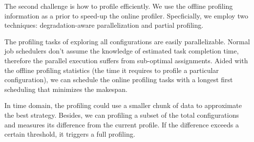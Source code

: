The second challenge is how to profile efficiently. We use the offline profiling
information as a prior to speed-up the online profiler. Specficially, we employ
two techniques: degradation-aware parallelization and partial profiling.

 The profiling tasks of exploring all
configurations are easily parallelizable. Normal job schedulers don't assume the
knowledge of estimated task completion time, therefore the parallel execution
suffers from sub-optimal assignments. Aided with the offline profiling
statistics (the time it requires to profile a particular configuration), we can
schedule the online profiling tasks with a longest first scheduling that
minimizes the makespan.

 In time domain, the profiling could use a smaller
chunk of data to approximate the best strategy. Besides, we can profiling a
subset of the total configurations and measures its difference from the current
profile. If the difference exceeds a certain threshold, it triggers a full
profiling.

